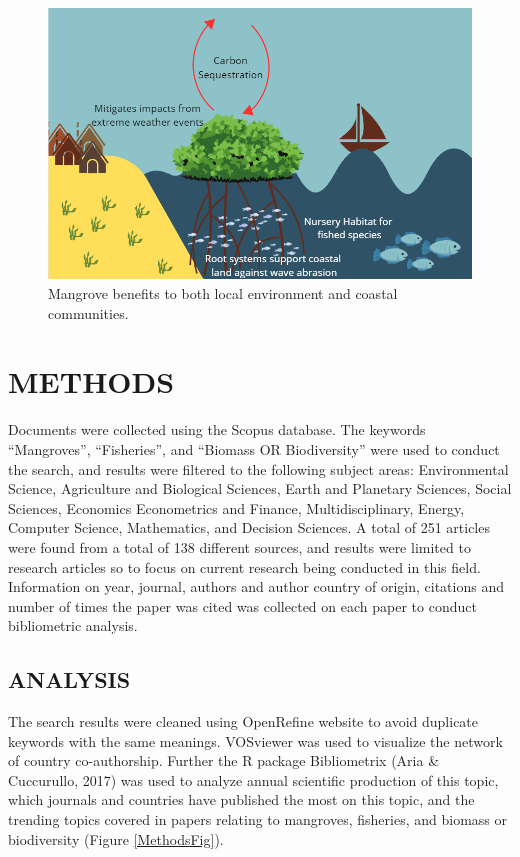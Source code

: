 \documentclass[
  12pt,
]{article}
\begin{document}
\begin{figure}
\includegraphics[width=11.54in]{IntroFig} \caption{Mangrove benefits to both local environment and coastal communities. \label{IntroFig}}\label{fig:IntroFig}
\end{figure}

\hypertarget{methods}{%
\section{METHODS}\label{methods}}

Documents were collected using the Scopus database. The keywords ``Mangroves'', ``Fisheries'', and ``Biomass OR Biodiversity'' were used to conduct the search, and results were filtered to the following subject areas: Environmental Science, Agriculture and Biological Sciences, Earth and Planetary Sciences, Social Sciences, Economics Econometrics and Finance, Multidisciplinary, Energy, Computer Science, Mathematics, and Decision Sciences. A total of 251 articles were found from a total of 138 different sources, and results were limited to research articles so to focus on current research being conducted in this field. Information on year, journal, authors and author country of origin, citations and number of times the paper was cited was collected on each paper to conduct bibliometric analysis.

\hypertarget{analysis}{%
\subsection{ANALYSIS}\label{analysis}}

The search results were cleaned using OpenRefine website to avoid duplicate keywords with the same meanings. VOSviewer was used to visualize the network of country co-authorship. Further the R package Bibliometrix (Aria \& Cuccurullo, 2017) was used to analyze annual scientific production of this topic, which journals and countries have published the most on this topic, and the trending topics covered in papers relating to mangroves, fisheries, and biomass or biodiversity (Figure \ref{MethodsFig}).
\end{document}
